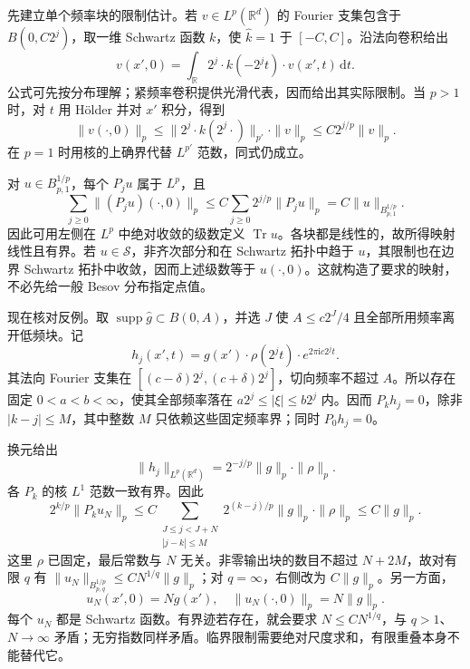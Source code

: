 \begin{solution}
先建立单个频率块的限制估计。若 \(v\in L^p(\mathbb R^d)\) 的 Fourier 支集包含于 \(B(0,C2^j)\)，取一维 Schwartz 函数 \(k\)，使 \(\widehat k=1\) 于 \([-C,C]\)。沿法向卷积给出
\[
 v(x',0)=\int_{\mathbb R}2^j\cdot k(-2^jt)\cdot v(x',t)\,\mathrm dt.
\]
公式可先按分布理解；紧频率卷积提供光滑代表，因而给出其实际限制。当 \(p>1\) 时，对 \(t\) 用 Hölder 并对 \(x'\) 积分，得到
\[
 \|v(\cdot,0)\|_p
 \leq\|2^j\cdot k(2^j\cdot)\|_{p'}\cdot\|v\|_p
 \leq C2^{j/p}\|v\|_p.
\]
在 \(p=1\) 时用核的上确界代替 \(L^{p'}\) 范数，同式仍成立。

对 \(u\in B^{1/p}_{p,1}\)，每个 \(P_ju\) 属于 \(L^p\)，且
\[
 \sum_{j\geq0}\|(P_ju)(\cdot,0)\|_p
 \leq C\sum_{j\geq0}2^{j/p}\|P_ju\|_p
 =C\|u\|_{B^{1/p}_{p,1}}.
\]
因此可用左侧在 \(L^p\) 中绝对收敛的级数定义 \(\operatorname{Tr}u\)。各块都是线性的，故所得映射线性且有界。若 \(u\in\mathcal S\)，非齐次部分和在 Schwartz 拓扑中趋于 \(u\)，其限制也在边界 Schwartz 拓扑中收敛，因而上述级数等于 \(u(\cdot,0)\)。这就构造了要求的映射，不必先给一般 Besov 分布指定点值。

现在核对反例。取 \(\operatorname{supp}\widehat g\subset B(0,A)\)，并选 \(J\) 使 \(A\leq c2^J/4\) 且全部所用频率离开低频块。记
\[
 h_j(x',t)=g(x')\cdot\rho(2^jt)\cdot e^{2\pi\mathrm i c2^jt}.
\]
其法向 Fourier 支集在
\([(c-\delta)2^j,(c+\delta)2^j]\)，切向频率不超过 \(A\)。所以存在固定 \(0<a<b<\infty\)，使其全部频率落在
\(a2^j\leq|\xi|\leq b2^j\) 内。因而 \(P_kh_j=0\)，除非 \(|k-j|\leq M\)，其中整数 \(M\) 只依赖这些固定频率界；同时 \(P_0h_j=0\)。

换元给出
\[
 \|h_j\|_{L^p(\mathbb R^d)}
 =2^{-j/p}\|g\|_p\cdot\|\rho\|_p.
\]
各 \(P_k\) 的核 \(L^1\) 范数一致有界。因此
\[
 2^{k/p}\|P_ku_N\|_p
 \leq C\sum_{\substack{J\leq j<J+N\\|j-k|\leq M}}
                     2^{(k-j)/p}\|g\|_p\cdot\|\rho\|_p
 \leq C\|g\|_p.
\]
这里 \(\rho\) 已固定，最后常数与 \(N\) 无关。非零输出块的数目不超过 \(N+2M\)，故对有限 \(q\) 有
\(\|u_N\|_{B^{1/p}_{p,q}}\leq C N^{1/q}\|g\|_p\)；对 \(q=\infty\)，右侧改为 \(C\|g\|_p\)。另一方面，
\[
 u_N(x',0)=Ng(x'),\quad
 \|u_N(\cdot,0)\|_p=N\|g\|_p.
\]
每个 \(u_N\) 都是 Schwartz 函数。有界迹若存在，就会要求 \(N\leq C N^{1/q}\)，与 \(q>1\)、\(N\to\infty\) 矛盾；无穷指数同样矛盾。临界限制需要绝对尺度求和，有限重叠本身不能替代它。
\end{solution}

